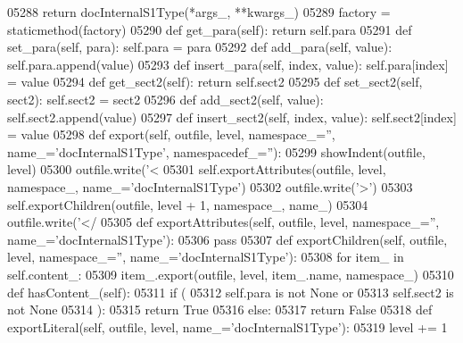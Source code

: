 \begin{DoxyCode}
{{{{{{{{{{{{{{{{{{{{{{{{{{{{{{{{{{{{{{{{{{{{{{{{{{{{{{{{{{{{{{{{{{{{{{{{{{{{{{{{{{{{{{{{{{{{{{{{{{{{{{{{{{{{{{{{{{{{{{{{{{{{{{{{{{{{{{{{{{{{{{{{{{{{{{{{{{{{{{{{{{{{{{{{{{{{{{{{{{{{{{{{{{{{{{{{{{{{{{{{{{{{{{{{{{{{{{{{{{{{{{{{{{{{{{{{{{{{{{{{{{{{{{{{{{{{{{{{{{{{{{{{{{{{{{{{{{{{{{{{{{{{{{{{{{{{{{{{{{{{{{{{{{{{{{{{{{{{{{{{{{{{{{{{{{{{{{{{{{05288             \textcolor{keywordflow}{return} docInternalS1Type(*args\_, **kwargs\_)
05289     factory = staticmethod(factory)
05290     \textcolor{keyword}{def }get_para(self): \textcolor{keywordflow}{return} self.para
05291     \textcolor{keyword}{def }set_para(self, para): self.para = para
05292     \textcolor{keyword}{def }add_para(self, value): self.para.append(value)
05293     \textcolor{keyword}{def }insert_para(self, index, value): self.para[index] = value
05294     \textcolor{keyword}{def }get_sect2(self): \textcolor{keywordflow}{return} self.sect2
05295     \textcolor{keyword}{def }set_sect2(self, sect2): self.sect2 = sect2
05296     \textcolor{keyword}{def }add_sect2(self, value): self.sect2.append(value)
05297     \textcolor{keyword}{def }insert_sect2(self, index, value): self.sect2[index] = value
05298     \textcolor{keyword}{def }export(self, outfile, level, namespace\_='', name\_='docInternalS1Type', namespacedef\_=''):
05299         showIndent(outfile, level)
05300         outfile.write(\textcolor{stringliteral}{'<%
05301         self.exportAttributes(outfile, level, namespace\_, name\_=\textcolor{stringliteral}{'docInternalS1Type'})
05302         outfile.write(\textcolor{stringliteral}{'>'})
05303         self.exportChildren(outfile, level + 1, namespace\_, name\_)
05304         outfile.write(\textcolor{stringliteral}{'</%
05305     \textcolor{keyword}{def }exportAttributes(self, outfile, level, namespace\_='', name\_='docInternalS1Type'):
05306         \textcolor{keywordflow}{pass}
05307     \textcolor{keyword}{def }exportChildren(self, outfile, level, namespace\_='', name\_='docInternalS1Type'):
05308         \textcolor{keywordflow}{for} item\_ \textcolor{keywordflow}{in} self.content\_:
05309             item\_.export(outfile, level, item\_.name, namespace\_)
05310     \textcolor{keyword}{def }hasContent_(self):
05311         \textcolor{keywordflow}{if} (
05312             self.para \textcolor{keywordflow}{is} \textcolor{keywordflow}{not} \textcolor{keywordtype}{None} \textcolor{keywordflow}{or}
05313             self.sect2 \textcolor{keywordflow}{is} \textcolor{keywordflow}{not} \textcolor{keywordtype}{None}
05314             ):
05315             \textcolor{keywordflow}{return} \textcolor{keyword}{True}
05316         \textcolor{keywordflow}{else}:
05317             \textcolor{keywordflow}{return} \textcolor{keyword}{False}
05318     \textcolor{keyword}{def }exportLiteral(self, outfile, level, name\_='docInternalS1Type'):
05319         level += 1
}}}}}}}}}}}}}}}}}}}}}}}}}}}}}}}}}}}}}}}}}}}}}}}}}}}}}}}}}}}}}}}}}}}}}}}}}}}}}}}}}}}}}}}}}}}}}}}}}}}}}}}}}}}}}}}}}}}}}}}}}}}}}}}}}}}}}}}}}}}}}}}}}}}}}}}}}}}}}}}}}}}}}}}}}}}}}}}}}}}}}}}}}}}}}}}}}}}}}}}}}}}}}}}}}}}}}}}}}}}}}}}}}}}}}}}}}}}}}}}}}}}}}}}}}}}}}}}}}}}}}}}}}}}}}}}}}}}}}}}}}}}}}}}}}}}}}}}}}}}}}}}}}}}}}}}}}}}}}}}}}}}}}}}}}}}}}}}}}}}}
\end{DoxyCode}
